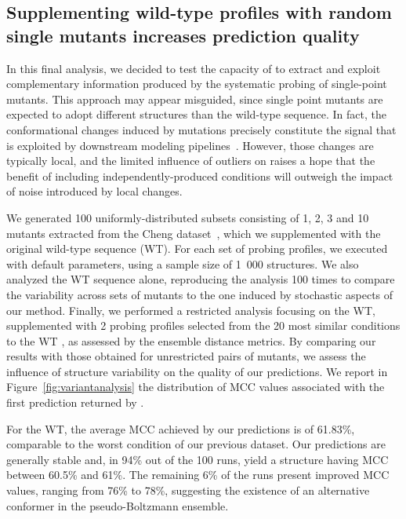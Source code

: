 \documentclass[a4,center,fleqn]{NAR}
\begin{document}
\subsection*{Supplementing wild-type profiles with random single mutants increases prediction quality}
In this final analysis, we decided to test the capacity of \OurTool to extract and exploit complementary information produced by the systematic probing of single-point mutants.
This approach may appear misguided, since single point mutants are expected to adopt different structures than the wild-type sequence. In fact, the conformational changes induced by mutations precisely constitute the signal that is exploited by downstream modeling pipelines~\cite{Cordero2015}. However, those changes are typically local, and the limited influence of outliers on \OurTool{} raises a hope that the benefit of including independently-produced conditions will outweigh the impact of noise introduced by local changes.

We generated 100 uniformly-distributed subsets consisting of 1, 2, 3 and 10 mutants extracted from the Cheng dataset~\cite{Cheng2017}, which we supplemented with the original wild-type sequence (WT).
For each set of probing profiles, we executed \OurTool{} with default parameters, using a sample size of 1~000 structures. 
We also analyzed the WT sequence alone, reproducing the analysis 100 times to compare the variability across sets of mutants to the one induced by stochastic aspects of our method. 
Finally, we performed a restricted analysis focusing on the WT, supplemented with 2 probing profiles selected from the 20 most similar conditions to the WT , as assessed by the ensemble distance metrics. By comparing our results with those obtained for unrestricted pairs of mutants, we assess the influence of structure variability on the quality of our predictions. We report in Figure~\ref{fig:variantanalysis} the distribution of MCC values associated with the first prediction returned by \OurTool.

For the WT, the average MCC achieved by our predictions is of 61.83\%, comparable to the worst condition of our previous dataset.
Our predictions are generally stable and, in 94\% out of the 100 runs, yield a structure having MCC between 60.5\% and 61\%. The remaining 6\% of the runs present improved MCC values, ranging from 76\% to 78\%, suggesting the existence of an alternative conformer in the pseudo-Boltzmann ensemble.
\end{document}
